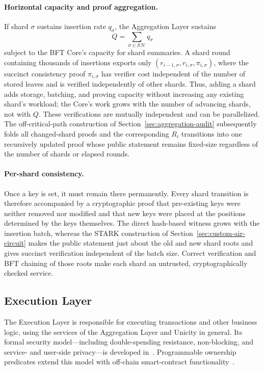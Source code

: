 \documentclass[11pt]{article}
\begin{document}
\paragraph{Horizontal capacity and proof aggregation.}
If shard $\sigma$ sustains insertion rate $q_\sigma$, the Aggregation Layer sustains
\[
    Q=\sum_{\sigma\in\mathcal{SH}} q_\sigma
\]
subject to the BFT Core's capacity for shard summaries. A shard round containing thousands of insertions exports only $(r_{i-1,\sigma},r_{i,\sigma},\pi_{i,\sigma})$, where the succinct consistency proof $\pi_{i,\sigma}$ has verifier cost independent of the number of stored leaves and is verified independently of other shards. Thus, adding a shard adds storage, batching, and proving capacity without increasing any existing shard's workload; the Core's work grows with the number of advancing shards, not with $Q$. These verifications are mutually independent and can be parallelized. The off-critical-path construction of Section~\ref{sec:aggregation-audit} subsequently folds all changed-shard proofs and the corresponding $R_i$ transitions into one recursively updated proof whose public statement remains fixed-size regardless of the number of shards or elapsed rounds.

\paragraph{Per-shard consistency.}
Once a key is set, it must remain there permanently. Every shard transition is therefore accompanied by a cryptographic proof that pre-existing keys were neither removed nor modified and that new keys were placed at the positions determined by the keys themselves. The direct hash-based witness grows with the insertion batch, whereas the STARK construction of Section~\ref{sec:custom-air-circuit} makes the public statement just about the old and new shard roots and gives succinct verification independent of the batch size. Correct verification and BFT chaining of those roots make each shard an untrusted, cryptographically checked service.


\subsection{Execution Layer}

The Execution Layer is responsible for executing transactions and other business logic, using the services of the Aggregation Layer and Unicity in general. Its formal security model---including double-spending resistance, non-blocking, and service- and user-side privacy---is developed in~\cite{exemodel}. Programmable ownership predicates extend this model with off-chain smart-contract functionality~\cite{predicates}.
\end{document}
